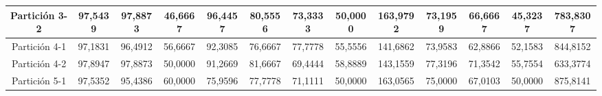 \documentclass[12pt]{article}
\begin{document}
\begin{table}[]
{\begin{tabular}{|c|cccc|cccc|cccc|}
Partición 3-2 & \multicolumn{1}{c|}{97,5439}                                                  & \multicolumn{1}{c|}{97,8873}                                                 & \multicolumn{1}{c|}{46,6667} & 96,4457  & \multicolumn{1}{c|}{80,5556}                                                  & \multicolumn{1}{c|}{73,3333}                                                 & \multicolumn{1}{c|}{50,0000} & 163,9792 & \multicolumn{1}{c|}{73,1959}                                                  & \multicolumn{1}{c|}{66,6667}                                                 & \multicolumn{1}{c|}{45,3237} & 783,8307 \\ \hline
Partición 4-1 & \multicolumn{1}{c|}{97,1831}                                                  & \multicolumn{1}{c|}{96,4912}                                                 & \multicolumn{1}{c|}{56,6667} & 92,3085  & \multicolumn{1}{c|}{76,6667}                                                  & \multicolumn{1}{c|}{77,7778}                                                 & \multicolumn{1}{c|}{55,5556} & 141,6862 & \multicolumn{1}{c|}{73,9583}                                                  & \multicolumn{1}{c|}{62,8866}                                                 & \multicolumn{1}{c|}{52,1583} & 844,8152 \\ \hline
Partición 4-2 & \multicolumn{1}{c|}{97,8947}                                                  & \multicolumn{1}{c|}{97,8873}                                                 & \multicolumn{1}{c|}{50,0000} & 91,2669  & \multicolumn{1}{c|}{81,6667}                                                  & \multicolumn{1}{c|}{69,4444}                                                 & \multicolumn{1}{c|}{58,8889} & 143,1559 & \multicolumn{1}{c|}{77,3196}                                                  & \multicolumn{1}{c|}{71,3542}                                                 & \multicolumn{1}{c|}{55,7554} & 633,3774 \\ \hline
Partición 5-1 & \multicolumn{1}{c|}{97,5352}                                                  & \multicolumn{1}{c|}{95,4386}                                                 & \multicolumn{1}{c|}{60,0000} & 75,9596  & \multicolumn{1}{c|}{77,7778}                                                  & \multicolumn{1}{c|}{71,1111}                                                 & \multicolumn{1}{c|}{50,0000} & 163,0565 & \multicolumn{1}{c|}{75,0000}                                                  & \multicolumn{1}{c|}{67,0103}                                                 & \multicolumn{1}{c|}{50,0000} & 875,8141 \\ \hline

\end{tabular}}
\end{table}
\end{document}
